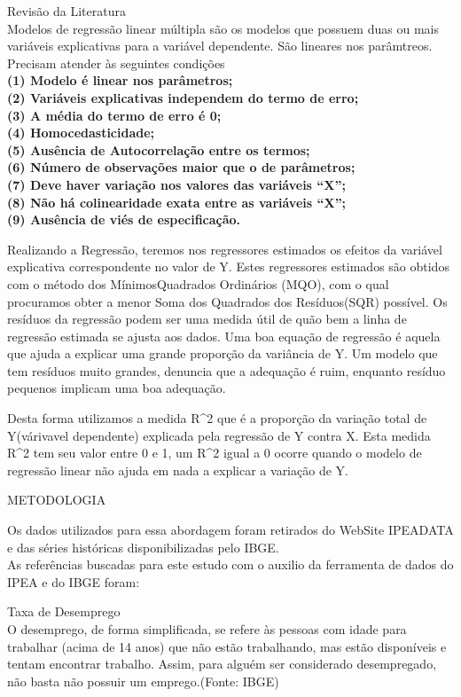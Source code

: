\documentclass[
]{article}
\begin{document}
Revisão da Literatura\\
Modelos de regressão linear múltipla são os modelos que possuem duas ou
mais variáveis explicativas para a variável dependente. São lineares nos
parâmtreos. Precisam atender às seguintes condições\\
\textbf{(1) Modelo é linear nos parâmetros;}\\
\textbf{(2) Variáveis explicativas independem do termo de erro;}\\
\textbf{(3) A média do termo de erro é 0;}\\
\textbf{(4) Homocedasticidade;}\\
\textbf{(5) Ausência de Autocorrelação entre os termos;}\\
\textbf{(6) Número de observações maior que o de parâmetros;}\\
\textbf{(7) Deve haver variação nos valores das variáveis ``X'';}\\
\textbf{(8) Não há colinearidade exata entre as variáveis ``X'';}\\
\textbf{(9) Ausência de viés de especificação.}

Realizando a Regressão, teremos nos regressores estimados os efeitos da
variável explicativa correspondente no valor de Y. Estes regressores
estimados são obtidos com o método dos MínimosQuadrados Ordinários
(MQO), com o qual procuramos obter a menor Soma dos Quadrados dos
Resíduos(SQR) possível. Os resíduos da regressão podem ser uma medida
útil de quão bem a linha de regressão estimada se ajusta aos dados. Uma
boa equação de regressão é aquela que ajuda a explicar uma grande
proporção da variância de Y. Um modelo que tem resíduos muito grandes,
denuncia que a adequação é ruim, enquanto resíduo pequenos implicam uma
boa adequação.

Desta forma utilizamos a medida R\^{}2 que é a proporção da variação
total de Y(várivavel dependente) explicada pela regressão de Y contra X.
Esta medida R\^{}2 tem seu valor entre 0 e 1, um R\^{}2 igual a 0 ocorre
quando o modelo de regressão linear não ajuda em nada a explicar a
variação de Y.

METODOLOGIA

Os dados utilizados para essa abordagem foram retirados do WebSite
IPEADATA e das séries históricas disponibilizadas pelo IBGE.\\
As referências buscadas para este estudo com o auxilio da ferramenta de
dados do IPEA e do IBGE foram:

Taxa de Desemprego\\
O desemprego, de forma simplificada, se refere às pessoas com idade para
trabalhar (acima de 14 anos) que não estão trabalhando, mas estão
disponíveis e tentam encontrar trabalho. Assim, para alguém ser
considerado desempregado, não basta não possuir um emprego.(Fonte: IBGE)
\end{document}
